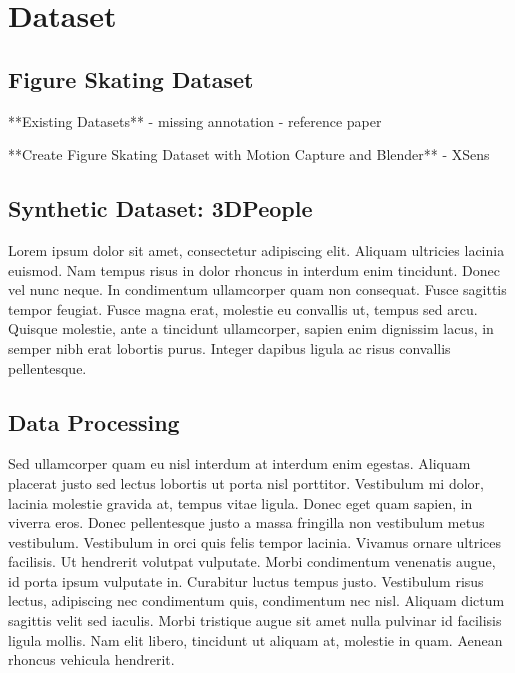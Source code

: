 

\chapter{Dataset} %

\label{Synthetic Dataset} %



\section{Figure Skating Dataset}

**Existing Datasets**
- missing annotation
- reference paper

**Create Figure Skating Dataset with Motion Capture and Blender**
- XSens



\section{Synthetic Dataset: 3DPeople}

Lorem ipsum dolor sit amet, consectetur adipiscing elit. Aliquam ultricies lacinia euismod. Nam tempus risus in dolor
rhoncus in interdum enim tincidunt. Donec vel nunc neque. In condimentum ullamcorper quam non consequat. Fusce
sagittis tempor feugiat. Fusce magna erat, molestie eu convallis ut, tempus sed arcu. Quisque molestie, ante a
tincidunt ullamcorper, sapien enim dignissim lacus, in semper nibh erat lobortis purus. Integer dapibus ligula ac
risus convallis pellentesque.


\section{Data Processing}

Sed ullamcorper quam eu nisl interdum at interdum enim egestas. Aliquam placerat justo sed lectus lobortis ut porta
nisl porttitor. Vestibulum mi dolor, lacinia molestie gravida at, tempus vitae ligula. Donec eget quam sapien, in
viverra eros. Donec pellentesque justo a massa fringilla non vestibulum metus vestibulum. Vestibulum in orci quis
felis tempor lacinia. Vivamus ornare ultrices facilisis. Ut hendrerit volutpat vulputate. Morbi condimentum venenatis
augue, id porta ipsum vulputate in. Curabitur luctus tempus justo. Vestibulum risus lectus, adipiscing nec
condimentum quis, condimentum nec nisl. Aliquam dictum sagittis velit sed iaculis. Morbi tristique augue sit amet
nulla pulvinar id facilisis ligula mollis. Nam elit libero, tincidunt ut aliquam at, molestie in quam. Aenean rhoncus
vehicula hendrerit.
